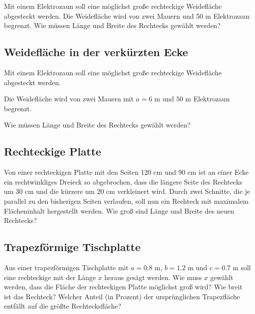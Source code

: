 Mit einem Elektrozaun soll eine möglichst große rechteckige
Weidefläche abgesteckt werden.
Die Weidefläche wird von zwei Mauern und 50 m
Elektrozaun begrenzt.
Wie
müssen Länge und Breite des Rechtecks gewählt werden?


\subsection{Weidefläche in der verkürzten Ecke}

Mit einem Elektrozaun soll eine möglichst große rechteckige
Weidefläche abgesteckt werden.

Die Weidefläche wird von zwei Mauern
mit $a=6 \text{ m}$ und $50 \text{ m}$
Elektrozaun begrenzt.

Wie müssen Länge und Breite des Rechtecks gewählt werden?


\subsection{Rechteckige Platte}
Von einer rechteckigen Platte mit den Seiten 120 cm und 90 cm ist an
einer Ecke ein rechtwinkliges Dreieck so abgebrochen, dass die längere
Seite des Rechtecks um 30 cm und die kürzere um 20 cm verkleinert
wird. Durch zwei Schnitte, die je parallel zu den bisherigen Seiten
verlaufen, soll nun ein Rechteck mit maximalem Flächeninhalt hergestellt werden.
Wie groß sind Länge und Breite des neuen Rechtecks?

\subsection{Trapezförmige Tischplatte}
Aus einer trapezförmigen Tischplatte mit
$a = 0.8 \text{ m}$, $b = 1.2 \text{ m}$ und $c = 0.7 \text{ m}$ soll eine
rechteckige mit der Länge $x$ heraus gesägt
werden. Wie muss $x$ gewählt werden, dass
die Fläche der rechteckigen Platte möglichst
groß wird? Wie breit ist das Rechteck? Welcher
Anteil (in Prozent) der ursprünglichen Trapezfläche entfällt auf die größte Rechtecksfläche?

